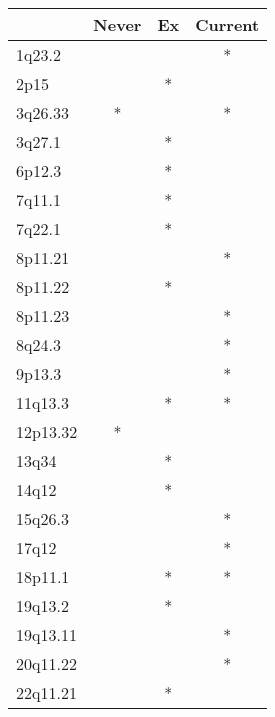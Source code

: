 \begin{tabular}{lccc}
\toprule
{} & Never & Ex & Current \\
\midrule
1q23.2   &       &    &       * \\
2p15     &       &  * &         \\
3q26.33  &     * &    &       * \\
3q27.1   &       &  * &         \\
6p12.3   &       &  * &         \\
7q11.1   &       &  * &         \\
7q22.1   &       &  * &         \\
8p11.21  &       &    &       * \\
8p11.22  &       &  * &         \\
8p11.23  &       &    &       * \\
8q24.3   &       &    &       * \\
9p13.3   &       &    &       * \\
11q13.3  &       &  * &       * \\
12p13.32 &     * &    &         \\
13q34    &       &  * &         \\
14q12    &       &  * &         \\
15q26.3  &       &    &       * \\
17q12    &       &    &       * \\
18p11.1  &       &  * &       * \\
19q13.2  &       &  * &         \\
19q13.11 &       &    &       * \\
20q11.22 &       &    &       * \\
22q11.21 &       &  * &         \\
\bottomrule
\end{tabular}
